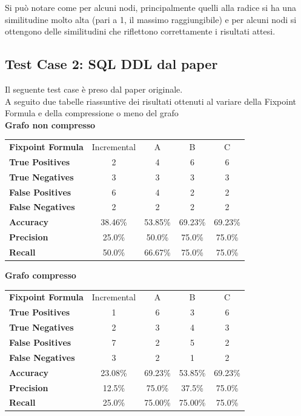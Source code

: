 \documentclass[a4paper,10pt]{article}
\begin{document}
\newpage

Si può notare come per alcuni nodi, principalmente quelli alla radice si ha una similitudine molto alta (pari a 1, il massimo raggiungibile) e per alcuni nodi si ottengono delle similitudini che riflettono correttamente i risultati attesi.\\

\subsection{Test Case 2: SQL DDL dal paper}


Il seguente test case è preso dal paper originale.\\

A seguito due tabelle riassuntive dei risultati ottenuti al variare della Fixpoint Formula e della compressione o meno del grafo\\

\textbf{Grafo non compresso}

\begin{center}
\begin{tabular}{| l | c | c | c | c |}
	\hline
	\textbf{Fixpoint Formula} & Incremental & A & B & C\\
	\hhline{|=|=|=|=|=|}
	\textbf{True Positives} & 2 & 4 & 6 & 6\\
	\hline
	\textbf{True Negatives} & 3 & 3 & 3 & 3\\
	\hline
	\textbf{False Positives} & 6 & 4 & 2 & 2\\
	\hline
	\textbf{False Negatives} & 2 & 2 & 2 & 2\\
	\hline
	\textbf{Accuracy} & 38.46\% & 53.85\% & 69.23\% & 69.23\%\\
	\hline
	\textbf{Precision} & 25.0\% & 50.0\% & 75.0\% & 75.0\%\\
	\hline
	\textbf{Recall} & 50.0\% & 66.67\% & 75.0\% & 75.0\%\\
	\hline
\end{tabular}
\end{center}
\vspace{4mm}

\textbf{Grafo compresso}

\begin{center}
\begin{tabular}{| l | c | c | c | c |}
	\hline
	\textbf{Fixpoint Formula} & Incremental & A & B & C\\
	\hhline{|=|=|=|=|=|}
	\textbf{True Positives} & 1 & 6 & 3 & 6\\
	\hline
	\textbf{True Negatives} & 2 & 3 & 4 & 3\\
	\hline
	\textbf{False Positives} & 7 & 2 & 5 & 2\\
	\hline
	\textbf{False Negatives} & 3 & 2 & 1 & 2\\
	\hline
	\textbf{Accuracy} & 23.08\% & 69.23\% & 53.85\% & 69.23\%\\
	\hline
	\textbf{Precision} & 12.5\% & 75.0\% & 37.5\% & 75.0\%\\
	\hline
	\textbf{Recall} & 25.0\% & 75.00\% & 75.00\% & 75.0\%\\
	\hline
\end{tabular}
\end{center}
\vspace{2mm}
\end{document}
